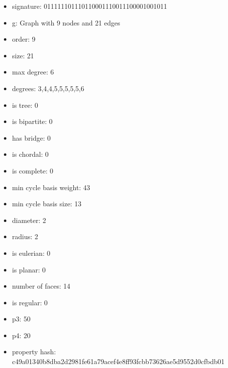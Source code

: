 \newpage
\begin{figure}
\end{figure}
\begin{itemize}
\item signature: 011111101110110001110011100001001011
\item g: Graph with 9 nodes and 21 edges
\item order: 9
\item size: 21
\item max degree: 6
\item degrees: 3,4,4,5,5,5,5,5,6
\item is tree: 0
\item is bipartite: 0
\item has bridge: 0
\item is chordal: 0
\item is complete: 0
\item min cycle basis weight: 43
\item min cycle basis size: 13
\item diameter: 2
\item radius: 2
\item is eulerian: 0
\item is planar: 0
\item number of faces: 14
\item is regular: 0
\item p3: 50
\item p4: 20
\item property hash: c49a01340b8dba2d2981fe61a79acef4e8ff93fcbb73626ae5d9552d0cfbdb01
\end{itemize}
